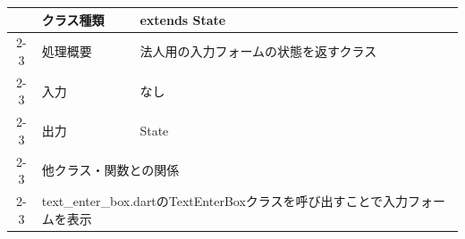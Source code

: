 \begin{table}[H]
\begin{tabular}{|c|l|l|}
                          & クラス種類                                                                             & extends State                                           \\ \cline{2-3}
                          & 処理概要                                                                              & \multicolumn{1}{p{12cm}|}{法人用の入力フォームの状態を返すクラス}          \\ \cline{2-3}
                          & 入力                                                                                & なし                                                      \\ \cline{2-3}
                          & 出力                                                                                & State                                                   \\ \cline{2-3}
                          & \multicolumn{2}{l|}{他クラス・関数との関係}                                                                                                            \\ \cline{2-3}
                          & \multicolumn{2}{p{14cm}|}{text\_enter\_box.dartのTextEnterBoxクラスを呼び出すことで入力フォームを表示}                                                           \\ \hline
  \end{tabular}
\end{table}\par
\ \par
\ \par
\ \par

